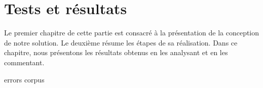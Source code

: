 \chapter{Tests et résultats}%
\label{chap.results}

Le premier chapitre de cette partie est consacré à la présentation de la conception de notre solution.
Le deuxième résume les étapes de sa réalisation.
Dans ce chapitre, nous présentons les résultats obtenus en les analysant et en les commentant.

{errors}
{corpus}